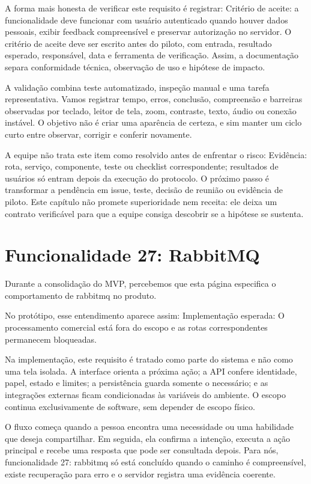 \documentclass[12pt,oneside,a4paper,article]{abntex2}
\begin{document}
A forma mais honesta de verificar este requisito é registrar: Critério de aceite: a funcionalidade deve funcionar com usuário autenticado quando houver dados pessoais, exibir feedback compreensível e preservar autorização no servidor. O critério de aceite deve ser escrito antes do piloto, com entrada, resultado esperado, responsável, data e ferramenta de verificação. Assim, a documentação separa conformidade técnica, observação de uso e hipótese de impacto.

A validação combina teste automatizado, inspeção manual e uma tarefa representativa. Vamos registrar tempo, erros, conclusão, compreensão e barreiras observadas por teclado, leitor de tela, zoom, contraste, texto, áudio ou conexão instável. O objetivo não é criar uma aparência de certeza, e sim manter um ciclo curto entre observar, corrigir e conferir novamente.

A equipe não trata este item como resolvido antes de enfrentar o risco: Evidência: rota, serviço, componente, teste ou checklist correspondente; resultados de usuários só entram depois da execução do protocolo. O próximo passo é transformar a pendência em issue, teste, decisão de reunião ou evidência de piloto. Este capítulo não promete superioridade nem receita: ele deixa um contrato verificável para que a equipe consiga descobrir se a hipótese se sustenta.

\section{Funcionalidade 27: RabbitMQ}
Durante a consolidação do MVP, percebemos que esta página especifica o comportamento de rabbitmq no produto.

No protótipo, esse entendimento aparece assim: Implementação esperada: O processamento comercial está fora do escopo e as rotas correspondentes permanecem bloqueadas.

Na implementação, este requisito é tratado como parte do sistema e não como uma tela isolada. A interface orienta a próxima ação; a API confere identidade, papel, estado e limites; a persistência guarda somente o necessário; e as integrações externas ficam condicionadas às variáveis do ambiente. O escopo continua exclusivamente de software, sem depender de escopo físico.

O fluxo começa quando a pessoa encontra uma necessidade ou uma habilidade que deseja compartilhar. Em seguida, ela confirma a intenção, executa a ação principal e recebe uma resposta que pode ser consultada depois. Para nós, funcionalidade 27: rabbitmq só está concluído quando o caminho é compreensível, existe recuperação para erro e o servidor registra uma evidência coerente.
\end{document}
